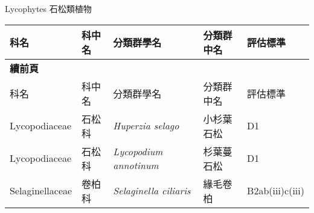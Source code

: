 \noindent\normalfont\selectfont Lycophytes 石松類植物
\footnotesize\selectfont
        {\def\arraystretch{1.5}\tabcolsep=2pt
        \begin{longtable}{p{2.5cm}p{2.5cm}p{4.5cm}p{2.5cm}p{3cm}}
        \toprule
          科名 & 科中名 & 分類群學名 & 分類群中名 & 評估標準 \\
        \midrule 
        \endfirsthead

        {{\bfseries 續前頁 }} \\
        科名 & 科中名 & 分類群學名 & 分類群中名 & 評估標準 \\
        \midrule
        \endhead
                Lycopodiaceae & 石松科 & \textit{Huperzia selago}  & 小杉葉石松 & D1 \index{Huperzia@\textit{Huperzia}!selago@\textit{selago}}  \index{小杉葉石松} \\
    Lycopodiaceae & 石松科 & \textit{Lycopodium annotinum}  & 杉葉蔓石松 & D1 \index{Lycopodium@\textit{Lycopodium}!annotinum@\textit{annotinum}}  \index{杉葉蔓石松} \\
    Selaginellaceae & 卷柏科 & \textit{Selaginella ciliaris}  & 緣毛卷柏 & B2ab(iii)c(iii) \index{Selaginella@\textit{Selaginella}!ciliaris@\textit{ciliaris}}  \index{緣毛卷柏} \\
    \bottomrule
        \end{longtable}
        }
    
